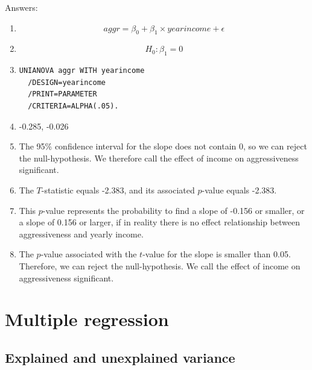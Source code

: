 \documentclass[]{book}\usepackage[]{graphicx}\usepackage[]{color}
\begin{document}
Answers:

\begin{enumerate}
\item

\begin{equation}
aggr = \beta_0 + \beta_1 \times yearincome + \epsilon
\end{equation}

\item
\begin{equation}
H_0 : \beta_1 = 0
\end{equation}


\item
\begin{verbatim}
UNIANOVA aggr WITH yearincome
  /DESIGN=yearincome
  /PRINT=PARAMETER
  /CRITERIA=ALPHA(.05).
\end{verbatim}




\item

 -0.285, -0.026



\item The 95\% confidence interval for the slope does not contain 0, so we can reject the null-hypothesis. We therefore call the effect of income on aggressiveness significant.

\item The $T$-statistic equals -2.383, and its associated $p$-value equals -2.383.

\item This $p$-value represents the probability to find a slope of -0.156 or smaller, or a slope of 0.156 or larger, if in reality there is no effect relationship between aggressiveness and yearly income.

\item The $p$-value associated with the $t$-value for the slope is smaller than 0.05. Therefore, we can reject the null-hypothesis. We  call the effect of income on aggressiveness significant.


\end{enumerate}





\chapter{Multiple regression}\label{chap:multip}


\section{Explained and unexplained variance}
\end{document}
